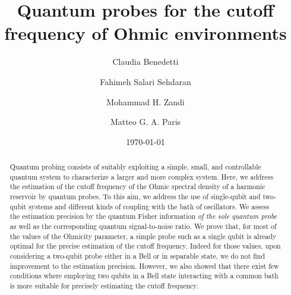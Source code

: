 \documentclass[ pra,a4paper,aps,twocolumn,superscriptaddress]{revtex4-1}
\def\tc#1{{\color{black}#1}}
\begin{document}
\title{Quantum probes for the cutoff frequency of Ohmic environments}
\author{Claudia Benedetti}
\author{Fahimeh Salari Sehdaran}
\author{Mohammad H. Zandi}
\author{Matteo G. A. Paris}
\date{\today}
\begin{abstract}
Quantum probing consists of suitably exploiting a simple, 
small, and controllable quantum system to characterize a larger 
and more complex system. Here, we address the estimation of the 
cutoff frequency of the Ohmic spectral density of a harmonic 
reservoir by quantum probes.  To this aim, we address the use of 
single-qubit and two-qubit systems and different kinds of coupling with 
the bath of oscillators. We assess the estimation precision by 
the quantum Fisher information {\it of the sole quantum probe} as well
as the corresponding quantum signal-to-noise ratio. We prove that, \tc{for 
most of the values of the Ohmicity parameter}, a 
simple probe such as a single qubit is \tc{already optimal} for the precise 
estimation of the cutoff frequency. 
Indeed \tc{for those values}, upon considering a two-qubit probe either 
\tc{in a Bell} or in separable state, we do not find improvement to the 
estimation precision. \tc{However, we also showed that there exist few 
conditions where employing two qubits in a Bell state interacting with a common bath 
is more suitable for precisely estimating the cutoff frequency.}
\end{abstract}
\maketitle
\end{document}

